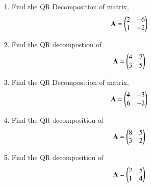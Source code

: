 \begin{enumerate}[label=\thesection.\arabic*.,ref=\thesection.\theenumi]
\solution

\item Find the QR Decomposition of matrix,
\begin{align}
\mathbf{A} = \begin{pmatrix}2&-6\\1&-2\end{pmatrix}
\label{eq:solutions/2/26/Q}
\end{align}
\solution

%
\item Find the QR decompostion of 
\begin{align} 
    \mathbf{A} = \begin{pmatrix}4 & 7 \\ 3 & 5\end{pmatrix}
\end{align}
%
\solution

\item Find the QR Decomposition of matrix,
\begin{align}
\mathbf{A} = \begin{pmatrix}4&-3\\6&-2\end{pmatrix}
\label{eq:solutions/2/28/Q}
\end{align}
%
\solution

\item Find the QR decomposition of 
\begin{align}
\mathbf{A}=\begin{pmatrix}8&5\\3&2\end{pmatrix} \label{eq:solutions/2/29/eq:1}
\end{align}
%
%
\item Find the QR decomposition of 
\begin{align}
\mathbf{A}=\begin{pmatrix}2&5\\1&4\end{pmatrix} \label{eq:solutions/2/30/1}
\end{align}

\solution

\end{enumerate}

